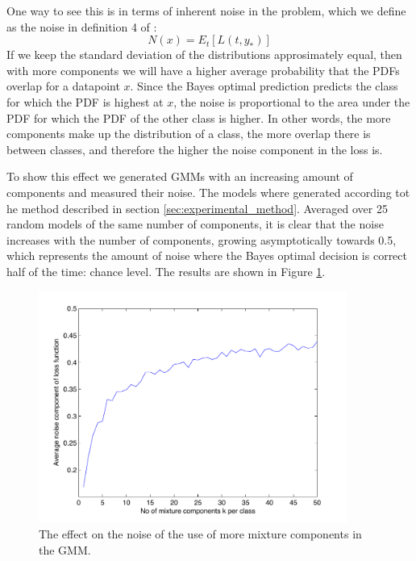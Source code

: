 \documentclass[a4paper]{article}
\begin{document}
One way to see this is in terms of inherent noise in the problem, which we define as the noise in definition 4 of \cite{Domingos2000}:
\begin{equation}
\label{eq:noise}
N(x) = E_t[L(t,y_*)]
\end{equation}
If we keep the standard deviation of the distributions approsimately equal, then with more components we will have a higher average probability that the \ac{PDF}s overlap for a datapoint $x$. Since the Bayes optimal prediction predicts the class for which the \ac{PDF} is highest at $x$, the noise is proportional to the area under the \ac{PDF} for which the \ac{PDF} of the other class is higher. In other words, the more components make up the distribution of a class, the more overlap there is between classes, and therefore the higher the noise component in the loss is.

To show this effect we generated \ac{GMM}s with an increasing amount of components and measured their noise. The models where generated according tot he method described in section \ref{sec:experimental_method}. Averaged over 25 random models of the same number of components, it is clear that the noise increases with the number of components, growing asymptotically towards 0.5, which represents the amount of noise where the Bayes optimal decision is correct half of the time: chance level. The results are shown in Figure \ref{fig:noisepercomp}.

\begin{figure}[H!]
    \centering
    \includegraphics[width=0.9\textwidth]{noisePerK.pdf}
    \caption{The effect on the noise of the use of more mixture components in the \ac{GMM}. \label{fig:noisepercomp}}
\end{figure}
\end{document}
